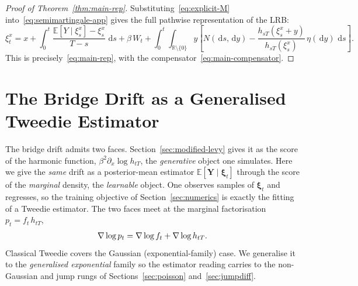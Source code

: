 \documentclass{article}
\def\R{\mathbb{R}}
\def\E{\mathbb{E}}
\def\d{\,\mathrm{d}}
\def\xib{\boldsymbol{\xi}}
\theoremstyle{definition}
\begin{document}
\begin{proof}[Proof of Theorem~\ref{thm:main-rep}]
\label{rem:full-decomp-app}
Substituting~\eqref{eq:explicit-M} into~\eqref{eq:semimartingale-app} gives the full pathwise representation of the LRB:
\begin{equation}\label{eq:full-decomp-app}
  \xi^{x}_t = x + \int_0^t \frac{\E[Y \mid \xi^{x}_s] - \xi^{x}_s}{T-s}\,\d s
    + \beta\,W_t
    + \int_0^t\!\int_{\R \setminus \{0\}} y \left[N(\d s, \d y) - \frac{h_{sT}(\xi^{x}_s + y)}{h_{sT}(\xi^{x}_s)}\,\eta(\d y)\,\d s\right].
\end{equation}
This is precisely~\eqref{eq:main-rep}, with the compensator~\eqref{eq:main-compensator}.
\end{proof}

\section{The Bridge Drift as a Generalised Tweedie Estimator}\label{sec:tweedie}

The bridge drift admits two faces. Section~\ref{sec:modified-levy} gives it as the score of the
harmonic function, $\beta^2\partial_x\log h_{tT}$, the \emph{generative} object one simulates. Here we
give the \emph{same} drift as a posterior-mean estimator $\E[\boldsymbol{Y}\mid\xib_t]$ through the
score of the \emph{marginal} density, the \emph{learnable} object. One observes samples of $\xib_t$
and regresses, so the training objective of Section~\ref{sec:numerics} is exactly the fitting of a
Tweedie estimator. The two faces meet at the marginal factorisation $p_t = f_t\,h_{tT}$,
\begin{align}
  \nabla\log p_t = \nabla\log f_t + \nabla\log h_{tT}. \notag
\end{align}
Classical Tweedie \cite{efron_tweedies_2011} covers the Gaussian (exponential-family) case. We
generalise it to the \emph{generalised exponential} family so the estimator reading carries to the
non-Gaussian and jump rungs of Sections~\ref{sec:poisson} and~\ref{sec:jumpdiff}.
\end{document}
